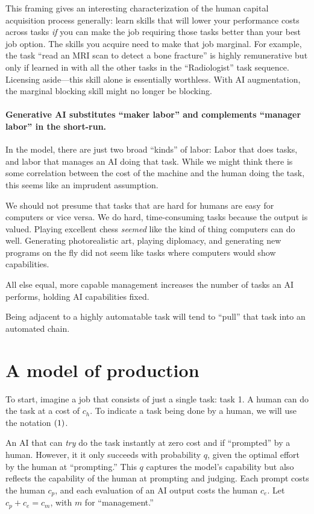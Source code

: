\documentclass{article}
\begin{document}
This framing gives an interesting characterization of the human capital acquisition process  generally: learn skills that will lower your performance costs across tasks \emph{if} you can make the job requiring those tasks better than your best job option.
The skills you acquire need to make that job marginal. 
For example, the task ``read an MRI scan to detect a bone fracture'' is highly remunerative but only if learned in with all the other tasks in the ``Radiologist'' task sequence.
Licensing aside---this skill alone is essentially worthless.  
With AI augmentation, the marginal blocking skill might no longer be blocking. 

\paragraph{Generative AI substitutes ``maker labor'' and complements ``manager labor'' in the short-run.}
In the model, there are just two broad ``kinds'' of labor: 
Labor that does tasks, and labor that manages an AI doing that task. 
While we might think there is some correlation between the cost of the machine and the human doing the task, this seems like an imprudent assumption.

We should not presume that tasks that are hard for humans are easy for computers or vice versa. 
We do hard, time-consuming tasks because the output is valued. 
Playing excellent chess \emph{seemed} like the kind of thing computers can do well. 
Generating photorealistic art, playing diplomacy, and generating new programs on the fly did not seem like tasks where computers would show capabilities.

All else equal, more capable management increases the number of tasks an AI performs, holding AI capabilities fixed. 

Being adjacent to a highly automatable task will tend to ``pull'' that task into an automated chain.

\section{A model of production}
To start, imagine a job that consists of just a single task: task 1.
A human can do the task at a cost of $c_h$.
To indicate a task being done by a human, we will use the notation $( 1 )$.

An AI that can \emph{try} do the task instantly at zero cost and if ``prompted'' by a human.
However, it it only succeeds with probability $q$, given the optimal effort by the human at ``prompting.''
This $q$ captures the model's capability but also reflects the capability of the human at prompting and judging.
Each prompt costs the human $c_p$, and each evaluation of an AI output costs the human $c_e$.
Let $c_p + c_e = c_m$, with $m$ for ``management.''
\end{document}
